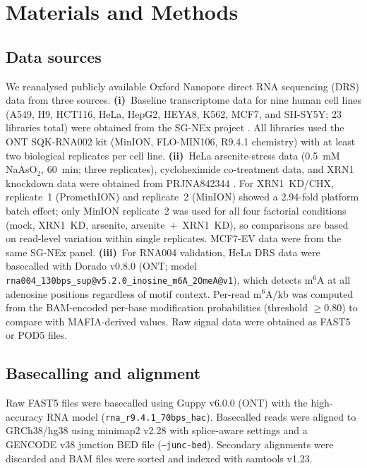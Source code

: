 \documentclass[11pt]{article}
\newcommand{\msix}{m$^6$A}
\begin{document}
\section{Materials and Methods}

\subsection*{Data sources}

We reanalysed publicly available Oxford Nanopore direct RNA sequencing
(DRS) data from three sources.
\textbf{(i)}~Baseline transcriptome data for nine human cell lines
(A549, H9, HCT116, HeLa, HepG2, HEYA8, K562, MCF7, and SH-SY5Y; 23
libraries total) were obtained from the SG-NEx project
\citep{ChenSGNEx2025}. All libraries used the ONT SQK-RNA002 kit
(MinION, FLO-MIN106, R9.4.1 chemistry) with at least two biological
replicates per cell line.
\textbf{(ii)}~HeLa arsenite-stress data (0.5~mM NaAsO$_2$, 60~min; three
replicates), cycloheximide co-treatment data, and XRN1 knockdown data
were obtained from PRJNA842344 \citep{deMuro2024}. For XRN1~KD/CHX,
replicate~1 (PromethION) and replicate~2 (MinION) showed a 2.94-fold
platform batch effect; only MinION replicate~2 was used for all four
factorial conditions (mock, XRN1~KD, arsenite, arsenite~+~XRN1~KD), so
comparisons are based on read-level variation within single
replicates. MCF7-EV data were from the same SG-NEx panel.
\textbf{(iii)}~For RNA004 validation, HeLa DRS data were basecalled with
Dorado v0.8.0 (ONT; model
\texttt{rna004\_130bps\_sup@v5.2.0\_inosine\_m6A\_2OmeA@v1}), which
detects \msix{} at all adenosine positions regardless of motif context.
Per-read \msix{}/kb was computed from the BAM-encoded per-base
modification probabilities (threshold $\geq 0.80$) to compare with
MAFIA-derived values. Raw signal data were obtained as FAST5 or POD5 files.

\subsection*{Basecalling and alignment}

Raw FAST5 files were basecalled using Guppy v6.0.0 (ONT) with the
high-accuracy RNA model (\texttt{rna\_r9.4.1\_70bps\_hac}). Basecalled
reads were aligned to GRCh38/hg38 using minimap2 v2.28
\citep{Li2018minimap2} with splice-aware settings and a GENCODE v38
junction BED file (\texttt{--junc-bed}). Secondary alignments were
discarded and BAM files were sorted and indexed with samtools v1.23.
\end{document}
